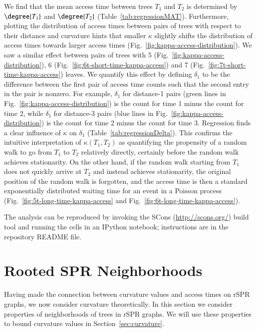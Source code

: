 \documentclass[]{elsarticle}
\begin{document}
We find that the mean access time between trees $T_1$ and $T_2$ is determined by $\degree{T_1}$ and $\degree{T_2}$ (Table~\ref{tab:regressionMAT}).
Furthermore, plotting the distribution of access times between pairs of trees with respect to their distance and curvature hints that smaller $\kappa$ slightly shifts the distribution of access times towards larger access times (Fig.~\ref{fig:kappa-access-distribution}).
We saw a similar effect between pairs of trees with 5 (Fig.~\ref{fig:kappa-access-distribution}), 6 (Fig.~\ref{fig:6t-short-time-kappa-access}) and 7 (Fig.~\ref{fig:7t-short-time-kappa-access}) leaves.
We quantify this effect by defining $\delta_1$ to be the difference between the first pair of access time counts such that the second entry in the pair is nonzero.
For example, $\delta_1$ for distance-1 pairs (green lines in Fig.~\ref{fig:kappa-access-distribution}) is the count for time 1 minus the count for time 2, while $\delta_1$ for distance-3 pairs (blue lines in Fig.~\ref{fig:kappa-access-distribution}) is the count for time 2 minus the count for time 3.
Regression finds a clear influence of $\kappa$ on $\delta_1$ (Table~\ref{tab:regressionDelta}).
This confirms the intuitive interpretation of $\kappa(T_1, T_2)$ as quantifying the propensity of a random walk to go from $T_1$ to $T_2$ relatively directly, certainly before the random walk achieves stationarity.
On the other hand, if the random walk starting from $T_1$ does not quickly arrive at $T_2$ and instead achieves stationarity, the original position of the random walk is forgotten, and the access time is then a standard exponentially distributed waiting time for an event in a Poisson process (Fig.~\ref{fig:5t-long-time-kappa-access} and Fig.~\ref{fig:6t-long-time-kappa-access}).

The analysis can be reproduced by invoking the SCons (\url{http://scons.org/}) build tool and running the cells in an IPython notebook; instructions are in the repository README file.


\section{Rooted SPR Neighborhoods}
\label{sec:neighborhoods}
Having made the connection between curvature values and access times on rSPR graphs, we now consider curvature theoretically.
In this section we consider properties of neighborhoods of trees in rSPR graphs.
We will use these properties to bound curvature values in Section~\ref{sec:curvature}.
\end{document}
